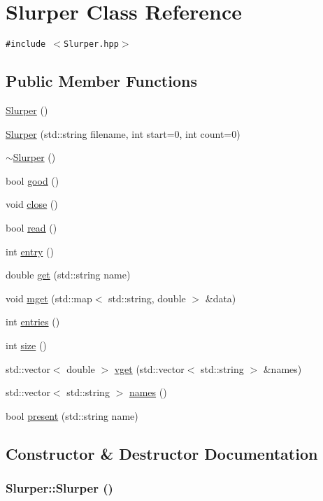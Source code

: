 \hypertarget{classSlurper}{
\section{Slurper Class Reference}
\label{classSlurper}
}
{\tt \#include $<$Slurper.hpp$>$}

\subsection*{Public Member Functions}
\begin{CompactItemize}
\item 
\hyperlink{classSlurper_a0}{Slurper} ()
\item 
\hyperlink{classSlurper_a1}{Slurper} (std::string filename, int start=0, int count=0)
\item 
\hyperlink{classSlurper_a2}{$\sim$Slurper} ()
\item 
bool \hyperlink{classSlurper_a3}{good} ()
\item 
void \hyperlink{classSlurper_a4}{close} ()
\item 
bool \hyperlink{classSlurper_a5}{read} ()
\item 
int \hyperlink{classSlurper_a6}{entry} ()
\item 
double \hyperlink{classSlurper_a7}{get} (std::string name)
\item 
void \hyperlink{classSlurper_a8}{mget} (std::map$<$ std::string, double $>$ \&data)
\item 
int \hyperlink{classSlurper_a9}{entries} ()
\item 
int \hyperlink{classSlurper_a10}{size} ()
\item 
std::vector$<$ double $>$ \hyperlink{classSlurper_a11}{vget} (std::vector$<$ std::string $>$ \&names)
\item 
std::vector$<$ std::string $>$ \hyperlink{classSlurper_a12}{names} ()
\item 
bool \hyperlink{classSlurper_a13}{present} (std::string name)
\end{CompactItemize}


\subsection{Constructor \& Destructor Documentation}
\hypertarget{classSlurper_a0}{
\subsubsection[Slurper]{\setlength{\rightskip}{0pt plus 5cm}Slurper::Slurper ()}}
\label{classSlurper_a0}


